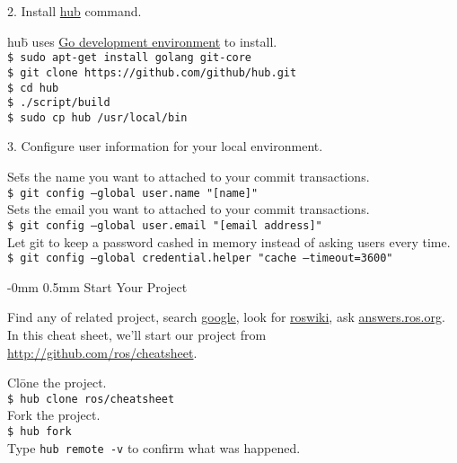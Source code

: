 \documentclass[10pt,landscape]{article}
\makeatletter
\renewcommand{\section}{\@startsection{section}{1}{0mm}%
                                {-0mm} %
                                {0.5mm}%
                                {\normalfont\large\bfseries}}
\makeatother
\begin{document}
\begin{multicols}{2}
\vspace{3mm}
2. Install \href{https://github.com/github/hub}{hub} command.
\begin{tabbing}
hu\=b uses \href{http://golang.org/doc/install}{Go development
  environment} to install.\\
\> \texttt{\$ sudo apt-get install golang git-core}\\
\> \texttt{\$ git clone https://github.com/github/hub.git}\\
\> \texttt{\$ cd hub}\\
\> \texttt{\$ ./script/build}\\
\> \texttt{\$ sudo cp hub /usr/local/bin}\\
\end{tabbing}

3. Configure user information for your local environment.

\begin{tabbing}
Se\=ts the name you want to attached to your commit transactions.\\
\> \texttt{\$ git config --global user.name "[name]"}\\  
Sets the email you want to attached to your commit transactions.\\
\> \texttt{\$ git config --global user.email "[email address]"}\\  
Let git to keep a password cashed in memory instead of asking users
every time.\\
\> \texttt{\$ git config --global credential.helper "cache --timeout=3600"}\\  
\end{tabbing}

\section{Start Your Project}
\vspace{2.5mm}

Find any of related project, search
\href{http://www.google.com}{google}, look for
\href{http://wiki.ros.org/}{roswiki}, ask
\href{http://answers.ros.org/questions/}{answers.ros.org}. 
In this cheat sheet, we'll start our project from \href{http://github.com/ros/cheatsheet}{http://github.com/ros/cheatsheet}.

\begin{tabbing}
Cl\=one the project.\\
\> \texttt{\$ hub clone ros/cheatsheet}\\  
Fork the project.\\
\> \texttt{\$ hub fork}\\ 
Type \texttt{hub remote -v} to confirm what was happened.\\
\end{tabbing}


\end{multicols}
\end{document}
